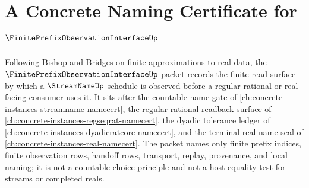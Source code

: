 \chapter{A Concrete Naming Certificate for $\FinitePrefixObservationInterfaceUp$}
\label{ch:concrete-instances-finite-prefix-observation-interface-namecert}

Following Bishop and Bridges on finite approximations to real data, the $\FinitePrefixObservationInterfaceUp$ packet records the finite read surface by which a $\StreamNameUp$ schedule is observed before a regular rational or real-facing consumer uses it. It sits after the countable-name gate of \autoref{ch:concrete-instances-streamname-namecert}, the regular rational readback surface of \autoref{ch:concrete-instances-regseqrat-namecert}, the dyadic tolerance ledger of \autoref{ch:concrete-instances-dyadicratcore-namecert}, and the terminal real-name seal of \autoref{ch:concrete-instances-real-namecert}. The packet names only finite prefix indices, finite observation rows, handoff rows, transport, replay, provenance, and local naming; it is not a countable choice principle and not a host equality test for streams or completed reals.

